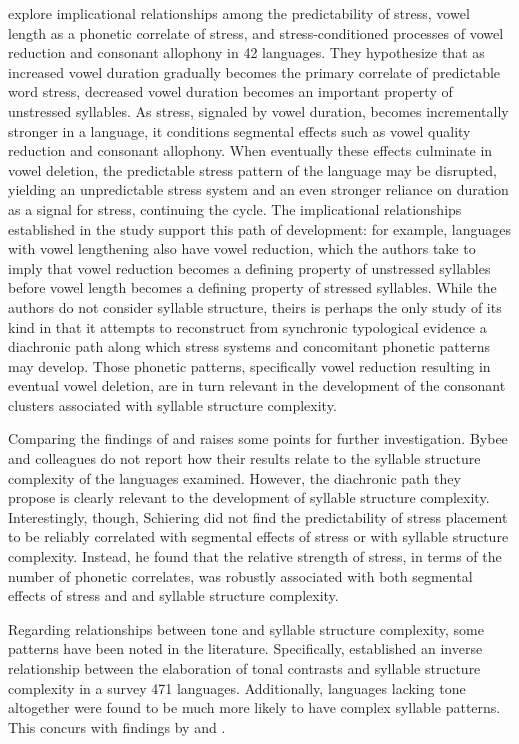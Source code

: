   \citet{BybeeEtAl1998} explore implicational relationships among the predictability of stress, vowel length as a phonetic correlate of stress, and stress-conditioned processes of vowel reduction and consonant allophony in 42 languages. They hypothesize that as increased vowel duration gradually becomes the primary correlate of predictable word stress, decreased vowel duration becomes an important property of unstressed syllables. As stress, signaled by vowel duration, becomes incrementally stronger in a language, it conditions segmental effects such as vowel quality reduction and consonant allophony. When eventually these effects culminate in vowel deletion, the predictable stress pattern of the language may be disrupted, yielding an unpredictable stress system and an even stronger reliance on duration as a signal for stress, continuing the cycle. The implicational relationships established in the study support this path of development: for example, languages with vowel lengthening also have vowel reduction, which the authors take to imply that vowel reduction becomes a defining property of unstressed syllables before vowel length becomes a defining property of stressed syllables. While the authors do not consider syllable structure, theirs is perhaps the only study of its kind in that it attempts to reconstruct from synchronic typological evidence a diachronic path along which stress systems and concomitant phonetic patterns may develop. Those phonetic patterns, specifically vowel reduction resulting in eventual vowel deletion, are in turn relevant in the development of the consonant clusters associated with syllable structure complexity.



  Comparing the findings of \citet{BybeeEtAl1998} and \citet{Schiering2007} raises some points for further investigation. Bybee and colleagues do not report how their results relate to the syllable structure complexity of the languages examined. However, the diachronic path they propose is clearly relevant to the development of syllable structure complexity. Interestingly, though, Schiering did not find the predictability of stress placement to be reliably correlated with segmental effects of stress or with syllable structure complexity. Instead, he found that the relative strength of stress, in terms of the number of phonetic correlates, was robustly associated with both segmental effects of stress and and syllable structure complexity.



  Regarding relationships between tone and syllable structure complexity, some patterns have been noted in the literature. Specifically, \citet{Maddieson2013d} established an inverse relationship between the elaboration of tonal contrasts and syllable structure complexity in a survey 471 languages. Additionally, languages lacking tone altogether were found to be much more likely to have complex syllable patterns. This concurs with findings by \citet{Auer1993} and \citet{Schiering2007}.


